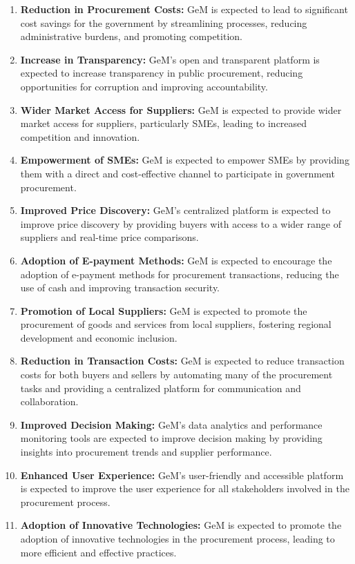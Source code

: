 \begin{enumerate}
    \item \textbf{Reduction in Procurement Costs:} GeM is expected to lead to significant cost savings for the government by streamlining processes, reducing administrative burdens, and promoting competition.
    
    \item \textbf{Increase in Transparency:} GeM's open and transparent platform is expected to increase transparency in public procurement, reducing opportunities for corruption and improving accountability.
    
    \item \textbf{Wider Market Access for Suppliers:} GeM is expected to provide wider market access for suppliers, particularly SMEs, leading to increased competition and innovation.
    
    \item \textbf{Empowerment of SMEs:} GeM is expected to empower SMEs by providing them with a direct and cost-effective channel to participate in government procurement.
    
    \item \textbf{Improved Price Discovery:} GeM's centralized platform is expected to improve price discovery by providing buyers with access to a wider range of suppliers and real-time price comparisons.
    
    \item \textbf{Adoption of E-payment Methods:} GeM is expected to encourage the adoption of e-payment methods for procurement transactions, reducing the use of cash and improving transaction security.
    
    \item \textbf{Promotion of Local Suppliers:} GeM is expected to promote the procurement of goods and services from local suppliers, fostering regional development and economic inclusion.
    
    \item \textbf{Reduction in Transaction Costs:} GeM is expected to reduce transaction costs for both buyers and sellers by automating many of the procurement tasks and providing a centralized platform for communication and collaboration.
    
    \item \textbf{Improved Decision Making:} GeM's data analytics and performance monitoring tools are expected to improve decision making by providing insights into procurement trends and supplier performance.
    
    \item \textbf{Enhanced User Experience:} GeM's user-friendly and accessible platform is expected to improve the user experience for all stakeholders involved in the procurement process.
    
    \item \textbf{Adoption of Innovative Technologies:} GeM is expected to promote the adoption of innovative technologies in the procurement process, leading to more efficient and effective practices.
\end{enumerate}

